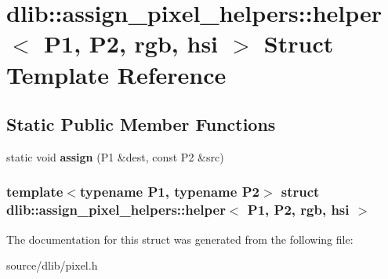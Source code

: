 \hypertarget{structdlib_1_1assign__pixel__helpers_1_1helper_3_01P1_00_01P2_00_01rgb_00_01hsi_01_4}{
\section{dlib::assign\_\-pixel\_\-helpers::helper$<$ P1, P2, rgb, hsi $>$ Struct Template Reference}
\label{structdlib_1_1assign__pixel__helpers_1_1helper_3_01P1_00_01P2_00_01rgb_00_01hsi_01_4}
}
\subsection*{Static Public Member Functions}
\begin{DoxyCompactItemize}
\item 
\hypertarget{structdlib_1_1assign__pixel__helpers_1_1helper_3_01P1_00_01P2_00_01rgb_00_01hsi_01_4_a94425f76d31c38f3f239a47f121e81e6}{
static void {\bfseries assign} (P1 \&dest, const P2 \&src)}
\label{structdlib_1_1assign__pixel__helpers_1_1helper_3_01P1_00_01P2_00_01rgb_00_01hsi_01_4_a94425f76d31c38f3f239a47f121e81e6}

\end{DoxyCompactItemize}
\subsubsection*{template$<$typename P1, typename P2$>$ struct dlib::assign\_\-pixel\_\-helpers::helper$<$ P1, P2, rgb, hsi $>$}



The documentation for this struct was generated from the following file:\begin{DoxyCompactItemize}
\item 
source/dlib/pixel.h\end{DoxyCompactItemize}
